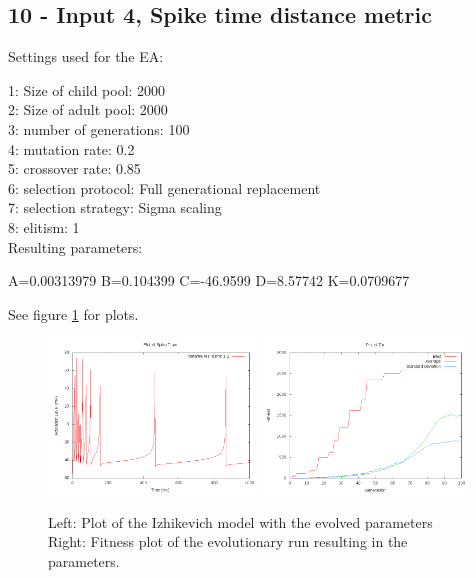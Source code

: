 \documentclass[11pt]{article}
\begin{document}
\subsection*{10 - Input 4, Spike time distance metric}

Settings used for the EA:

1: Size of child pool: 2000\\
2: Size of adult pool: 2000\\
3: number of generations: 100\\
4: mutation rate: 0.2\\
5: crossover rate: 0.85\\
6: selection protocol: Full generational replacement\\
7: selection strategy: Sigma scaling\\
8: elitism: 1\\

Resulting parameters:

A=0.00313979 B=0.104399 C=-46.9599 D=8.57742 K=0.0709677

See figure \ref{fig:10} for plots.

\begin{figure}
\begin{center}
\mbox{\includegraphics[width=0.49\textwidth]{images/10-res.png}}
\mbox{\includegraphics[width=0.49\textwidth]{images/10-fit.png}}
\end{center}
\caption{Left: Plot of the Izhikevich model with the evolved parameters\\
Right: Fitness plot of the evolutionary run resulting in the parameters.}
\label{fig:10}
\end{figure}
\end{document}
